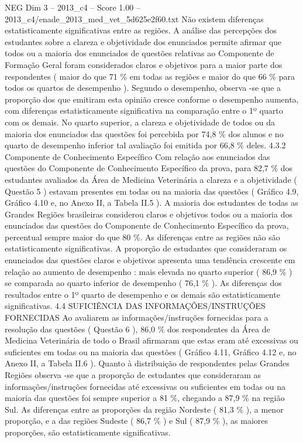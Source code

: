 \begin{textsample}{NEG Dim 3 – 2013\_c4 – Score 1.00 – 2013\_c4/enade\_2013\_med\_vet\_5d625e2f60.txt}
Não existem diferenças estatisticamente significativas entre as regiões.
A análise das percepções dos estudantes sobre a clareza e objetividade dos enunciados permite afirmar que todos ou a maioria dos enunciados de questões relativas ao Componente de Formação Geral foram considerados claros e objetivos para a maior parte dos respondentes ( maior do que 71 \% em todas as regiões e maior do que 66 \% para todos os quartos de desempenho ).
Segundo o desempenho, observa -se que a proporção dos que emitiram esta opinião cresce conforme o desempenho aumenta, com diferenças estatisticamente significativa na comparação entre o 1º quarto com os demais.
No quarto superior, a clareza e objetividade de todos ou da maioria dos enunciados das questões foi percebida por 74,8 \% dos alunos e no quarto de desempenho inferior tal avaliação foi emitida por 66,8 \% deles. 4.3.2 Componente de Conhecimento Específico Com relação aos enunciados das questões do Componente de Conhecimento Específico da prova, para 82,7 \% dos estudantes avaliados da Área de Medicina Veterinária a clareza e a objetividade ( Questão 5 ) estavam presentes em todas ou na maioria das questões ( Gráfico 4.9, Gráfico 4.10 e, no Anexo II, a Tabela II.5 ).
A maioria dos estudantes de todas as Grandes Regiões brasileiras considerou claros e objetivos todos ou a maioria dos enunciados das questões do Componente de Conhecimento Específico da prova, percentual sempre maior do que 80 \%.
As diferenças entre as regiões não são estatisticamente significativas.
A proporção de estudantes que consideraram os enunciados das questões claros e objetivos apresenta uma tendência crescente em relação ao aumento de desempenho : mais elevada no quarto superior ( 86,9 \% ) se comparada ao quarto inferior de desempenho ( 76,1 \% ).
As diferenças dos resultados entre o 1º quarto de desempenho e os demais são estatisticamente significativas. 4.4 SUFICIÊNCIA DAS INFORMAÇÕES/INSTRUÇÕES FORNECIDAS Ao avaliarem as informações/instruções fornecidas para a resolução das questões ( Questão 6 ), 86,0 \% dos respondentes da Área de Medicina Veterinária de todo o Brasil afirmaram que estas eram até excessivas ou suficientes em todas ou na maioria das questões ( Gráfico 4.11, Gráfico 4.12 e, no Anexo II, a Tabela II.6 ).
Quanto à distribuição de respondentes pelas Grandes Regiões observa -se que a proporção de estudantes que consideraram as informações/instruções fornecidas até excessivas ou suficientes em todas ou na maioria das questões foi sempre superior a 81 \%, chegando a 87,9 \% na região Sul.
As diferenças entre as proporções da região Nordeste ( 81,3 \% ), a menor proporção, e a das regiões Sudeste ( 86,7 \% ) e Sul ( 87,9 \% ), as maiores proporções, são estatisticamente significativas.

\end{textsample}
